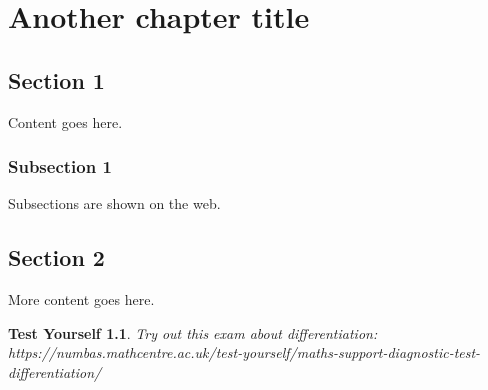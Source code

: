 \documentclass[a4paper]{report}
\newtheorem{nmbs_int}{Test Yourself}[section]
\newenvironment{numbas}[1][Visit the URL below to try a numbas exam:]{\begin{nmbs_int}\textrm{#1}\\}{\end{nmbs_int}}
\begin{document}
\setcounter{chapter}{1}
\chapter{Another chapter title}

\section{Section 1}
Content goes here.
\subsection{Subsection 1}
Subsections are shown on the web.
\section{Section 2}
More content goes here.

\begin{numbas}[Try out this exam about differentiation:]
https://numbas.mathcentre.ac.uk/test-yourself/maths-support-diagnostic-test-differentiation/
\end{numbas}
\end{document}
